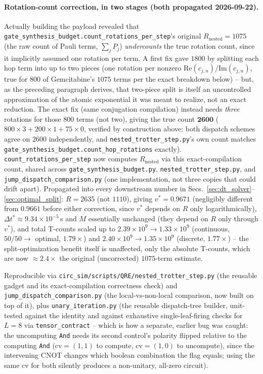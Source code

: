 \documentclass[11pt]{article}
\newcommand{\Dt}{\Delta t}
\begin{document}
\paragraph{Rotation-count correction, in two stages (both propagated 2026-09-22).} Actually building the payload revealed that \texttt{gate\_synthesis\_budget.count\_rotations\_per\_step}'s original $R_{\text{nested}}=1075$ (the raw count of Pauli terms, $\sum_jP_j$) \emph{undercounts} the true rotation count, since it implicitly assumed one rotation per term. A first fix gave $1800$ by splitting each hop term into up to two pieces (one rotation per nonzero $\text{Re}(c_{j,n})$/$\text{Im}(c_{j,n})$, true for $800$ of Gemcitabine's $1075$ terms per the exact breakdown below) -- but, as the preceding paragraph derives, that two-piece split is itself an uncontrolled approximation of the atomic exponential it was meant to realize, not an exact reduction. The exact fix (same conjugation compilation) instead needs \emph{three} rotations for those $800$ terms (not two), giving the true count $\mathbf{2600}$ ($800\times3+200\times1+75\times0$, verified by construction above: both dispatch schemes agree on $2600$ independently, and \texttt{nested\_trotter\_step.py}'s own count matches \texttt{gate\_synthesis\_budget.count\_hop\_rotations} exactly). \texttt{count\_rotations\_per\_step} now computes $R_{\text{nested}}$ via this exact-compilation count, shared across \texttt{gate\_synthesis\_budget.py}, \texttt{nested\_trotter\_step.py}, and \texttt{jump\_dispatch\_comparison.py} (one implementation, not three copies that could drift apart). Propagated into every downstream number in Secs.~\ref{sec:dt_solver}--\ref{sec:optimal_split}: $R=2635$ (not $1110$), giving $v^\ast=0.9671$ (negligibly different from $0.9661$ before either correction, since $v^\ast$ depends on $R$ only logarithmically), $\Dt^\ast\approx9.34\times10^{-5}\,$s and $M$ essentially unchanged (they depend on $R$ only through $v^\ast$), and total T-counts scaled up to $2.39\times10^9\to1.33\times10^9$ (continuous, $50/50\to$ optimal, $1.79\times$) and $2.40\times10^9\to1.35\times10^9$ (discrete, $1.77\times$) -- the split-optimization benefit itself is unaffected, only the absolute T-counts, which are now $\approx2.4\times$ the original (uncorrected) $1075$-term estimate.

Reproducible via \texttt{circ\_sim/scripts/QRE/nested\_trotter\_step.py} (the reusable gadget and its exact-compilation correctness check) and \texttt{jump\_dispatch\_comparison.py} (the local-vs-non-local comparison, now built on top of it), plus \texttt{unary\_iteration.py} (the reusable dispatch-tree builder, unit-tested against the identity and against exhaustive single-leaf-firing checks for $L=8$ via \texttt{tensor\_contract} -- which is how a separate, earlier bug was caught: the uncomputing \texttt{And} needs its second control's polarity flipped relative to the computing \texttt{And} (cv$=(1,1)$ to compute, cv$=(1,0)$ to uncompute), since the intervening CNOT changes which boolean combination the flag equals; using the same cv for both silently produces a non-unitary, all-zero circuit).
\end{document}
